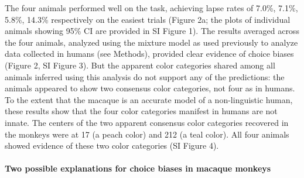 \documentclass[9pt,biorxiv,lineno,onehalfspacing]{lapreprint}
\begin{document}
\begin{refsection}
The four animals performed well on the task, achieving lapse rates of 7.0\%, 7.1\%, 5.8\%, 14.3\% respectively on the easiest trials (Figure 2a; the plots of individual animals showing 95\% CI are provided in SI Figure 1). 
The results averaged across the four animals, analyzed using the mixture model as used previously to analyze data collected in humans \citep{bae_why_2015,zhang_discrete_2008} (see Methods), provided clear evidence of choice biases (Figure 2, SI Figure 3). 
But the apparent color categories shared among all animals inferred using this analysis do not support any of the predictions: the animals appeared to show two consensus color categories, not four as in humans. 
To the extent that the macaque is an accurate model of a non-linguistic human, these results show that the four color categories manifest in humans are not innate. 
The centers of the two apparent consensus color categories recovered in the monkeys were at 17\degree{} (a peach color) and 212\degree{} (a teal color). 
All four animals showed evidence of these two color categories (SI Figure 4).

\paragraph{Two possible explanations for choice biases in macaque monkeys}


\end{refsection}
\end{document}
